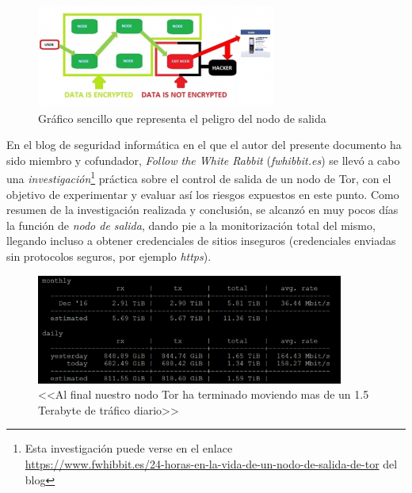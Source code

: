 \documentclass[a4paper, 11pt, titlepage]{article}
\begin{document}
            \begin{figure}[htp]
                \centering
                \includegraphics[width=0.7\textwidth]{resources/torspoiled2.png}
                \caption{Gráfico sencillo que representa el peligro del nodo de salida}
                \label{}
            \end{figure}

            En el blog de seguridad informática en el que el autor del presente documento ha sido miembro y cofundador, 
            \emph{Follow the White Rabbit} (\emph{fwhibbit.es}) se llevó a cabo una \emph{investigación}\footnote{Esta 
            investigación puede verse en el enlace \\ 
            \underline{https://www.fwhibbit.es/24-horas-en-la-vida-de-un-nodo-de-salida-de-tor} del blog} práctica sobre 
            el control de salida de un nodo de Tor, con el objetivo de experimentar y evaluar así los riesgos expuestos 
            en este punto. Como resumen de la investigación realizada y conclusión, se alcanzó en muy pocos días la 
            función de \emph{nodo de salida}, dando pie a la monitorización total del mismo, llegando incluso a obtener 
            credenciales de sitios inseguros (credenciales enviadas sin protocolos seguros, por ejemplo \emph{https}).

            \begin{figure}[htp]
                \centering
                \includegraphics[width=0.9\textwidth]{resources/nodosalida00.png}
                \caption{<<Al final nuestro nodo Tor ha terminado moviendo mas de un 1.5 Terabyte de tráfico diario>>}
                \label{}
            \end{figure}
\end{document}
